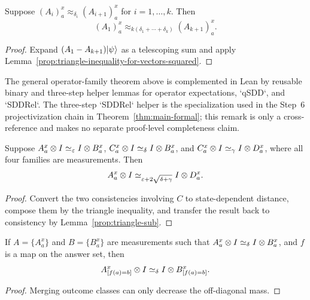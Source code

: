\begin{lemma}\label{prop:triangle-inequality-for-approx_delta}
	\leanok
	Suppose $(A_i)_a^x \approx_{\delta_i} (A_{i+1})_a^x$ for $i=1,\dots,k$. Then
	\[
		(A_1)_a^x \approx_{k(\delta_1+\cdots+\delta_k)} (A_{k+1})_a^x.
	\]
\end{lemma}
\begin{proof}
	\leanok
	Expand $(A_1-A_{k+1})\lvert \psi \rangle$ as a telescoping sum and apply Lemma~\ref{prop:triangle-inequality-for-vectors-squared}.
\end{proof}

\begin{remark}\label{rem:lean-finite-step-triangle-helpers}
	The general operator-family theorem above is complemented in Lean by reusable
	binary and three-step helper lemmas for operator expectations, `qSDD`, and
	`SDDRel`.  The three-step `SDDRel` helper is the specialization used in the
	Step~6 projectivization chain in Theorem~\ref{thm:main-formal}; this remark is
	only a cross-reference and makes no separate proof-level completeness claim.
\end{remark}

\begin{lemma}\label{prop:simeq-triangle-inequality}
	\leanok
	Suppose $A_a^x \otimes I \simeq_\varepsilon I \otimes B_a^x$, $C_a^x \otimes I \simeq_\delta I \otimes B_a^x$, and $C_a^x \otimes I \simeq_\gamma I \otimes D_a^x$, where all four families are measurements. Then
	\[
		A_a^x \otimes I \simeq_{\varepsilon + 2\sqrt{\delta+\gamma}} I \otimes D_a^x.
	\]
\end{lemma}
\begin{proof}
	\leanok
	Convert the two consistencies involving $C$ to state-dependent distance, compose them by the triangle inequality, and transfer the result back to consistency by Lemma~\ref{prop:triangle-sub}.
\end{proof}

\begin{lemma}\label{prop:simeq-data-processing}
	\leanok
	If $A=\{A_a^x\}$ and $B=\{B_a^x\}$ are measurements such that $A_a^x \otimes I \simeq_\delta I \otimes B_a^x$, and $f$ is a map on the answer set, then
	\[
		A_{[f(a)=b]}^x \otimes I \simeq_\delta I \otimes B_{[f(a)=b]}^x.
	\]
\end{lemma}
\begin{proof}
	\leanok
	Merging outcome classes can only decrease the off-diagonal mass.
\end{proof}

